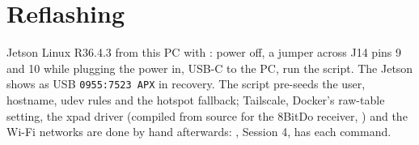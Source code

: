 \documentclass[11pt,a4paper]{article}
\begin{document}
\section{Reflashing}

Jetson Linux R36.4.3 from this PC with : power off,
a jumper across J14 pins 9 and 10 while plugging the power in, USB-C to the PC, run the script. The Jetson
shows as USB \texttt{0955:7523 APX} in recovery. The script pre-seeds the user, hostname, udev rules and the
hotspot fallback; Tailscale, Docker's raw-table setting, the xpad driver (compiled from source for the
8BitDo receiver, ) and the Wi-Fi networks are done by hand afterwards:
, Session 4, has each command.
\end{document}
